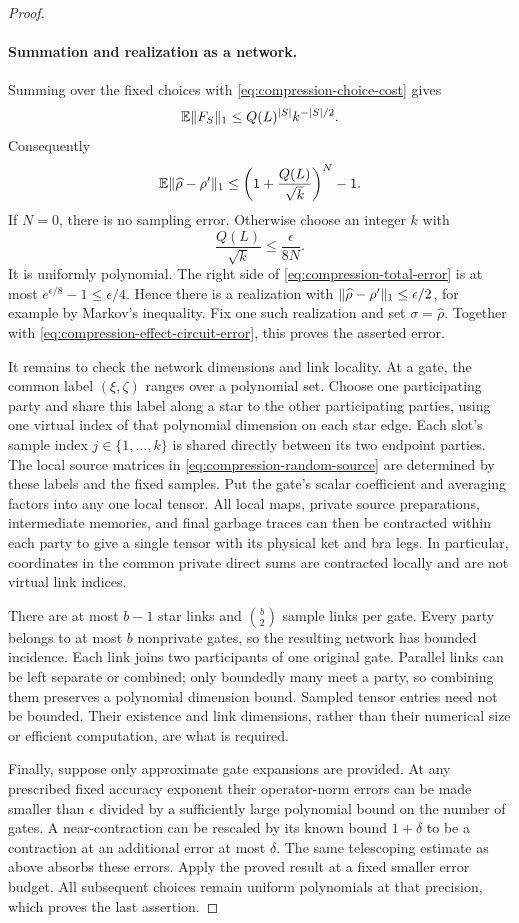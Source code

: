 \begin{proof}
\paragraph{Summation and realization as a network.}
Summing over the fixed choices with
\eqref{eq:compression-choice-cost} gives
\[
 \mathbb E\lVert F_S\rVert_1\le Q(L)^{|S|}k^{-|S|/2}.
\]
Consequently
\begin{equation}
 \mathbb E\lVert \widehat\rho-\rho'\rVert_1
 \le\left(1+\frac{Q(L)}{\sqrt k}\right)^N-1.
 \label{eq:compression-total-error}
\end{equation}
If $N=0$, there is no sampling error.  Otherwise choose an integer
$k$ with
\[
 \frac{Q(L)}{\sqrt k}\le\frac{\epsilon}{8N}.
\]
It is uniformly polynomial.  The right side of
\eqref{eq:compression-total-error} is at most
$e^{\epsilon/8}-1\le\epsilon/4$.  Hence there is a realization with
$\lVert \widehat\rho-\rho'\rVert_1\le\epsilon/2$, for example by Markov's
inequality.  Fix one such realization and set $\sigma=\widehat\rho$.
Together with \eqref{eq:compression-effect-circuit-error}, this proves
the asserted error.

It remains to check the network dimensions and link locality.  At a
gate, the common label $(\xi,\zeta)$ ranges over a polynomial set.
Choose one participating party and share this label along a star to
the other participating parties, using one virtual index of that
polynomial dimension on each star edge.  Each slot's sample index
$j\in\{1,\ldots,k\}$ is shared directly between its two endpoint
parties.  The local source matrices in
\eqref{eq:compression-random-source} are determined by these labels
and the fixed samples.  Put the gate's scalar coefficient and averaging
factors into any one local tensor.  All local maps, private source
preparations, intermediate memories, and final garbage traces can then
be contracted within each party to give a single tensor with its
physical ket and bra legs.  In particular, coordinates in the common
private direct sums are contracted locally and are not virtual link
indices.

There are at most $b-1$ star links and $\binom b2$ sample links per
gate.  Every party belongs to at most $b$ nonprivate gates, so the
resulting network has bounded incidence.  Each link joins two
participants of one original gate.  Parallel links can be left
separate or combined; only boundedly many meet a party, so combining
them preserves a polynomial dimension bound.  Sampled tensor entries
need not be bounded.  Their existence and link dimensions, rather than
their numerical size or efficient computation, are what is required.

Finally, suppose only approximate gate expansions are provided.  At
any prescribed fixed accuracy exponent their operator-norm errors can
be made smaller than $\epsilon$ divided by a sufficiently large
polynomial bound on the number of gates.  A near-contraction can be
rescaled by its known bound $1+\delta$ to be a contraction at an
additional error at most $\delta$.  The same telescoping estimate as
above absorbs these errors.  Apply the proved result at a fixed
smaller error budget.  All subsequent choices remain uniform
polynomials at that precision, which proves the last assertion.
\end{proof}

